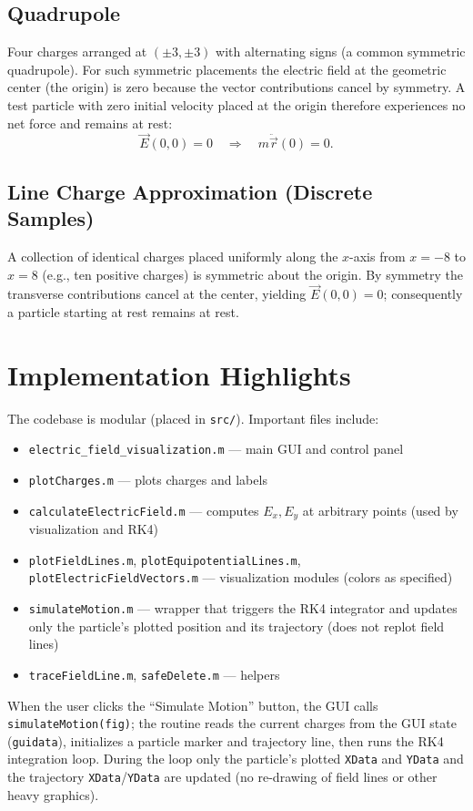 \documentclass[12pt,a4paper]{article}
\begin{document}
\subsection{Quadrupole}
Four charges arranged at $(\pm 3,\pm 3)$ with alternating signs (a common symmetric quadrupole). For such symmetric placements the electric field at the geometric center (the origin) is zero because the vector contributions cancel by symmetry. A test particle with zero initial velocity placed at the origin therefore experiences no net force and remains at rest:
\[
    \vec{E}(0,0)=0\quad\Rightarrow\quad m\ddot{\vec{r}}(0)=0.
\]

\subsection{Line Charge Approximation (Discrete Samples)}
A collection of identical charges placed uniformly along the $x$-axis from $x=-8$ to $x=8$ (e.g., ten positive charges) is symmetric about the origin. By symmetry the transverse contributions cancel at the center, yielding $\vec{E}(0,0)=0$; consequently a particle starting at rest remains at rest.

\section{Implementation Highlights}
The codebase is modular (placed in \texttt{src/}). Important files include:
\begin{itemize}
    \item \texttt{electric\_field\_visualization.m} — main GUI and control panel
    \item \texttt{plotCharges.m} — plots charges and labels
    \item \texttt{calculateElectricField.m} — computes $E_x,E_y$ at arbitrary points (used by visualization and RK4)
    \item \texttt{plotFieldLines.m}, \texttt{plotEquipotentialLines.m}, \texttt{plotElectricFieldVectors.m} — visualization modules (colors as specified)
    \item \texttt{simulateMotion.m} — wrapper that triggers the RK4 integrator and updates only the particle's plotted position and its trajectory (does not replot field lines)
    \item \texttt{traceFieldLine.m}, \texttt{safeDelete.m} — helpers
\end{itemize}

When the user clicks the ``Simulate Motion'' button, the GUI calls \texttt{simulateMotion(fig)}; the routine reads the current charges from the GUI state (\texttt{guidata}), initializes a particle marker and trajectory line, then runs the RK4 integration loop. During the loop only the particle's plotted \texttt{XData} and \texttt{YData} and the trajectory \texttt{XData}/\texttt{YData} are updated (no re-drawing of field lines or other heavy graphics).
\end{document}
